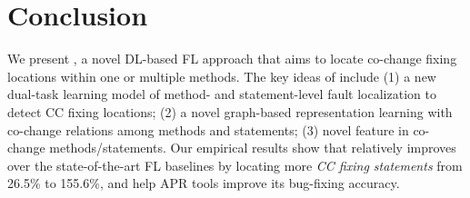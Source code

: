 \section{Conclusion}

We present {\tool}, a novel DL-based FL approach that aims to locate
co-change fixing locations within one or multiple methods. The key
ideas of {\tool} include (1) a new dual-task learning model of method-
and statement-level fault localization to detect CC fixing locations;
(2) a novel graph-based representation learning with co-change
relations among methods and statements; (3) novel feature in co-change
methods/statements. Our empirical results show that
%
{\tool} relatively improves over the state-of-the-art
FL baselines by locating more {\em CC fixing statements} from 26.5\% to
155.6\%, and help APR tools improve its bug-fixing accuracy.



